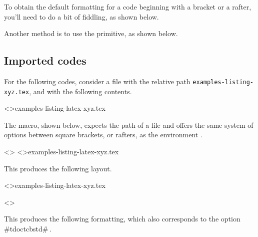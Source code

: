 \medskip

\begin{tdocwarn}
    To obtain the default formatting for a code beginning with a bracket or a rafter, you'll need to do a bit of fiddling, as shown below.

    \smallskip

    Another method is to use the  primitive, as shown below.
\end{tdocwarn}


\subsection{Imported codes}

For the following codes, consider a file with the relative path \verb+examples-listing-xyz.tex+, and with the following contents.

\tdoclatexinput<>{examples-listing-latex-xyz.tex}

\medskip

The  macro, shown below, expects the path of a file and offers the same system of options between square brackets, or rafters, as the environment .




\begin{tdocexa}
    \leavevmode

    \begin{tdoclatex}<>
\tdoclatexinput<>{examples-listing-latex-xyz.tex}
    \end{tdoclatex}

    This produces the following layout.

    \tdoclatexinput<>{examples-listing-latex-xyz.tex}
\end{tdocexa}




\begin{tdocexa}[Following]
    \leavevmode

    \begin{tdoclatex}<>
    \end{tdoclatex}

    This produces the following formatting, which also corresponds to the option \tdoclatexin#tdoctcb{std}#\,.

\end{tdocexa}


